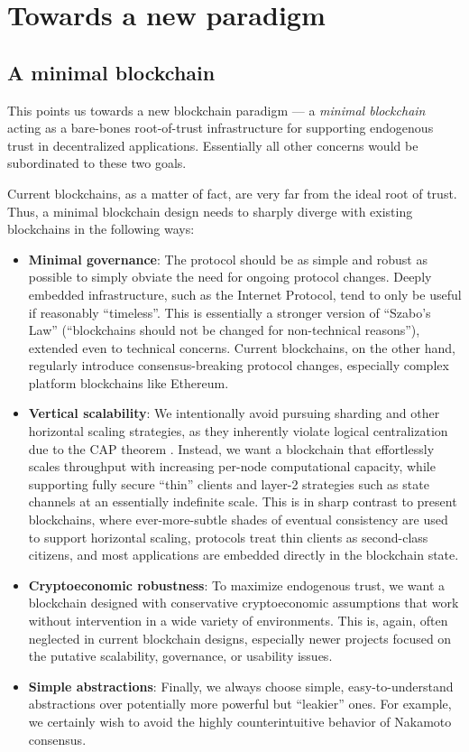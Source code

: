 \documentclass[headinclude,12pt]{scrbook}
\begin{document}
\section{Towards a new paradigm}

\subsection{A minimal blockchain}

This points us towards a new blockchain paradigm --- a \emph{minimal blockchain} acting as a bare-bones root-of-trust infrastructure for supporting endogenous trust in decentralized applications. Essentially all other concerns would be subordinated to these two goals.

Current blockchains, as a matter of fact, are very far from the ideal root of trust. Thus, a minimal blockchain design needs to sharply diverge with existing blockchains in the following ways:

\begin{itemize}
    \item \textbf{Minimal governance}: The protocol should be as simple and robust as possible to simply obviate the need for ongoing protocol changes. Deeply embedded infrastructure, such as the Internet Protocol, tend to only be useful if reasonably ``timeless''. This is essentially a stronger version of ``Szabo's Law'' (``blockchains should not be changed for non-technical reasons''), extended even to technical concerns. Current blockchains, on the other hand, regularly introduce consensus-breaking protocol changes, especially complex platform blockchains like Ethereum.
    \item \textbf{Vertical scalability}: We intentionally avoid pursuing sharding and other horizontal scaling strategies, as they inherently violate logical centralization due to the CAP theorem \cite{brewer2012cap}. Instead, we want a blockchain that effortlessly scales throughput with increasing per-node computational capacity, while supporting fully secure ``thin'' clients and layer-2 strategies such as state channels at an essentially indefinite scale. This is in sharp contrast to present blockchains, where ever-more-subtle shades of eventual consistency are used to support horizontal scaling, protocols treat thin clients as second-class citizens, and most applications are embedded directly in the blockchain state.
    \item \textbf{Cryptoeconomic robustness}: To maximize endogenous trust, we want a blockchain designed with conservative cryptoeconomic assumptions that work without intervention in a wide variety of environments. This is, again, often neglected in current blockchain designs, especially newer projects focused on the putative scalability, governance, or usability issues.
    \item \textbf{Simple abstractions}: Finally, we always choose simple, easy-to-understand abstractions over potentially more powerful but ``leakier'' ones. For example, we certainly wish to avoid the highly counterintuitive behavior of Nakamoto consensus.
\end{itemize}
\end{document}
